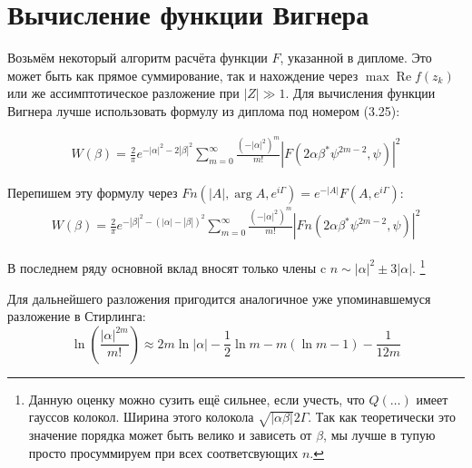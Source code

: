 \documentclass[a4paper, 12pt]{article}
\DeclareMathOperator{\Real}{Re}
\begin{document}
\section*{Вычисление функции Вигнера}
Возьмём некоторый алгоритм расчёта функции $F$, указанной в дипломе. Это может быть как прямое суммирование, так и нахождение через $\max \Real f(z_k)$ или же ассимптотическое разложение при $|Z|\gg 1$. Для вычисления функции Вигнера лучше использовать формулу из диплома под номером (3.25):

\begin{equation}\label{FtoWrow}
	\begin{aligned}
		W(\beta) = \frac{2}{\pi}e^{-|\alpha|^2-2|\beta|^2}\sum\limits_{m=0}^{\infty} \frac{\left(-|\alpha|^2\right)^m}{m!}\left|F(2\alpha \beta^*\psi^{2m-2}, \psi)\right|^2
	\end{aligned}
\end{equation}

Перепишем эту формулу через $Fn(|A|, \arg A, e^{i\Gamma}) = e^{-|A|}F(A, e^{i\Gamma})$:
\begin{equation}
	\begin{aligned}
		W(\beta) = \frac{2}{\pi}e^{-|\beta|^2 -\left(|\alpha|-|\beta|\right)^2}\sum\limits_{m=0}^{\infty} \frac{\left(-|\alpha|^2\right)^m}{m!}\left|Fn(2\alpha \beta^*\psi^{2m-2}, \psi)\right|^2
	\end{aligned}
\end{equation}

В последнем ряду основной вклад вносят только члены c $n\sim|\alpha|^2 \pm 3|\alpha|$.
\footnote{Данную оценку можно сузить ещё сильнее, если учесть, что $Q(\dots)$ имеет гауссов колокол. Ширина этого колокола $\sqrt{|\alpha\beta|}2\Gamma$. Так как теоретически это значение порядка может быть велико и зависеть  от $\beta$, мы лучше в тупую просто просуммируем при всех соответсвующих $n$.}

Для дальнейшего разложения пригодится аналогичное уже упоминавшемуся разложение в Стирлинга:
\begin{equation}
    \ln\left(\frac{|\alpha|^{2m}}{m!}\right)\approx 2m \ln|\alpha| - \frac{1}{2}\ln m - m \left(\ln m - 1\right) - \frac{1}{12m}
\end{equation}
\end{document}

